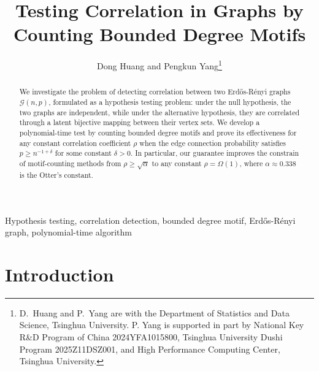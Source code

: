 \documentclass[letterpaper,11pt]{article}
\title{Testing Correlation in Graphs by Counting Bounded Degree Motifs}
\date{}
\author{Dong Huang and Pengkun Yang\thanks{D.\ Huang and P.\ Yang are with the Department of Statistics and Data Science, Tsinghua University. P. Yang is supported in part by National Key R\&D Program of China 2024YFA1015800, 
Tsinghua University Dushi Program 2025Z11DSZ001, and High Performance Computing Center, Tsinghua University.}}
\theoremstyle{definition}
\newcommand{\maG}{\mathcal{G}}
\newcommand{\ER}{Erd\H{o}s-R\'enyi }
\begin{document}
\maketitle

\begin{abstract}
We investigate the problem of detecting correlation between two \ER graphs $\maG(n,p)$, formulated as a hypothesis testing problem: under the null hypothesis, the two graphs are independent, while under the alternative hypothesis, they are correlated through a latent bijective mapping between their vertex sets. We develop a polynomial-time test by counting bounded degree motifs and prove its effectiveness for any constant correlation coefficient $\rho$ when the edge connection probability satisfies $p\ge n^{-1+\delta}$ for some constant $\delta>0$. 
In particular, our guarantee improves the constrain of motif-counting methods from $\rho\ge\sqrt{\alpha}$ to any constant $\rho = \Omega(1)$, where $\alpha\approx 0.338$ is the Otter's constant.
   
\end{abstract}

\begin{keywords}
    {Hypothesis testing, correlation detection, bounded degree motif, \ER graph, polynomial-time algorithm}
\end{keywords}


\section{Introduction}\label{sec-intro}
\end{document}
